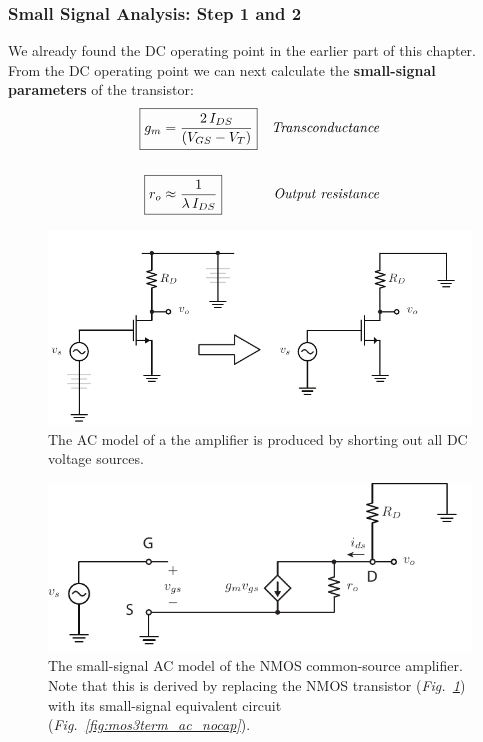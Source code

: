 \subsubsection{Small Signal Analysis:  Step 1 and 2}
We already found the DC operating point in the earlier part of this chapter.  From the DC operating point we can next calculate the \textbf{small-signal parameters} of the transistor:
    \begin{align*}
        \Aboxed{g_m &= \frac{2\,I_{DS}}{(V_{GS} - V_T)}} &\textit{Transconductance}\\[0.5cm]
        \Aboxed{r_o &\approx \frac{1}{\lambda\,I_{DS}}} &\textit{Output resistance}
    \end{align*}
\newpage
\begin{figure}[t]
\centering
\includegraphics[scale=1.15]{cs_amp_ac}
\caption{The AC model of a the amplifier is produced by shorting out all DC voltage sources.} \label{fig:cs_amp_ac}
\end{figure}
\begin{figure}[H]
\centering
\includegraphics[scale=1.25]{cs_amp_ss1}
\caption{The small-signal AC model of the NMOS common-source amplifier. Note that this is derived by replacing the NMOS transistor (\emph{Fig.~\ref{fig:cs_amp_ac}}) with its small-signal equivalent circuit (\emph{Fig.~\ref{fig:mos3term_ac_nocap}}).}
\label{fig:cs_amp_ss1}
\end{figure}
